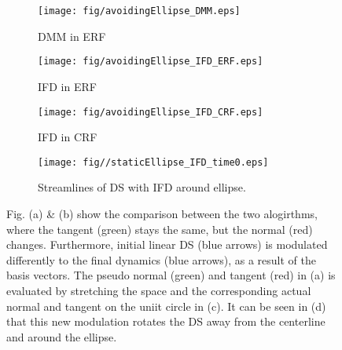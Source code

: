 \begin{figure*}[tb]\centering
\begin{subfigure}{.215\textwidth} %
\centering
\texttt{[image: fig/avoidingEllipse\_DMM.eps]}
\caption{DMM in ERF}
\label{fig:avoidingEllipse_DMM}
\end{subfigure} %
\begin{subfigure}{.215\textwidth} %
\centering
\texttt{[image: fig/avoidingEllipse\_IFD\_ERF.eps]}
\caption{IFD in ERF}
\label{fig:avoidingEllipse_IFD_ERF}
\end{subfigure}
\begin{subfigure}{.285\textwidth} %
\centering
\texttt{[image: fig/avoidingEllipse\_IFD\_CRF.eps]}
\caption{IFD in CRF}
\label{fig:avoidingEllipse_IFD_CRF}
\end{subfigure}
\begin{subfigure}{.24\textwidth} %
\centering
\texttt{[image: fig//staticEllipse\_IFD\_time0.eps]}
\caption{Streamlines of DS with IFD around ellipse.}
\label{fig:avoidingEllipse_IFD}
\end{subfigure}
\caption{Fig. (a) \& (b) show the comparison between the two alogirthms, where the tangent (green) stays the same, but the normal (red) changes. Furthermore, initial linear DS (blue arrows) is modulated differently to the final dynamics (blue arrows), as a result of the basis vectors. The pseudo normal (green) and tangent (red) in (a) is evaluated by stretching the space and the corresponding actual normal and tangent on the uniit circle in (c). It can be seen in (d) that this new modulation rotates the DS away from the centerline and around the ellipse.}
\label{fig:comparison_behaviour}
\end{figure*}



